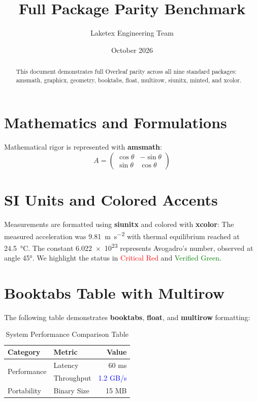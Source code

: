\documentclass[12pt, letterpaper]{article}
\title{Full Package Parity Benchmark}
\author{Laketex Engineering Team}
\date{October 2026}
\begin{document}
\maketitle

\begin{abstract}
This document demonstrates full Overleaf parity across all nine standard packages: amsmath, graphicx, geometry, booktabs, float, multirow, siunitx, minted, and xcolor.
\end{abstract}

\section{Mathematics and Formulations}
Mathematical rigor is represented with \textbf{amsmath}:
\begin{equation}
A = \begin{pmatrix}
\cos\theta & -\sin\theta \\
\sin\theta & \cos\theta
\end{pmatrix}
\end{equation}

\section{SI Units and Colored Accents}
Measurements are formatted using \textbf{siunitx} and colored with \textbf{xcolor}:
The measured acceleration was \SI{9.81}{\meter\per\second\squared} with thermal equilibrium reached at \qty{24.5}{\celsius}.
The constant \num{6.022e23} represents Avogadro's number, observed at angle \ang{45}.
We highlight the status in \textcolor{red}{Critical Red} and \textcolor{green}{Verified Green}.

\section{Booktabs Table with Multirow}
The following table demonstrates \textbf{booktabs}, \textbf{float}, and \textbf{multirow} formatting:
\begin{table}[H]
\centering
\begin{tabular}{llr}
\toprule
\textbf{Category} & \textbf{Metric} & \textbf{Value} \\
\midrule
\multirow{2}{*}{Performance} & Latency & 60 ms \\
 & Throughput & \textcolor{blue}{1.2 GB/s} \\
\midrule
Portability & Binary Size & 15 MB \\
\bottomrule
\end{tabular}
\caption{System Performance Comparison Table}
\label{tab:perf}
\end{table}
\end{document}
